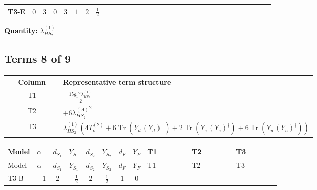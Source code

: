 \documentclass[8pt]{article}
\begin{document}
\begin{landscape}
\begin{longtable}{@{}llcccccc >{\raggedright\arraybackslash}p{0.21\linewidth} >{\raggedright\arraybackslash}p{0.21\linewidth} >{\raggedright\arraybackslash}p{0.21\linewidth}@{}}
\midrule
T3-E & $0$ & $3$ & $0$ & $3$ & $1$ & $2$ & $\frac{1}{2}$ & \scriptsize\adjustbox{max width=\linewidth}{$\begin{gathered} +6 {g_2}^4\end{gathered}$} & \scriptsize\adjustbox{max width=\linewidth}{$\begin{gathered} -\frac{33 {g_2}^2 {\lambda_{HS_2}^{(1)}}}{2}\end{gathered}$} & \scriptsize\adjustbox{max width=\linewidth}{$\begin{gathered} +3 {g_1}^4\end{gathered}$} \\
\midrule
\bottomrule
\end{longtable}
\clearpage
\noindent\textbf{Quantity: }$\lambda_{HS_2}^{(1)}$\par\smallskip
\subsection*{Terms 8 of 9}
\begin{center}
\begin{tabular}{@{}c >{\raggedright\arraybackslash}p{0.82\linewidth}@{}}
\toprule
Column & Representative term structure \\
\midrule
T1 & \(\displaystyle -\frac{15 {g_1}^2 {\lambda_{HS_2}^{(1)}}}{2}\) \\
\midrule
T2 & \(\displaystyle +6 {\lambda_{HS_2}^{(A)}}^2\) \\
\midrule
T3 & \(\displaystyle {\lambda_{HS_2}^{(1)}} (4 T_{\nu}^{(2)}+6 \operatorname{Tr}\!\left({Y_d}\,\left({Y_d}\right)^{\dagger}\right)+2 \operatorname{Tr}\!\left({Y_e}\,\left({Y_e}\right)^{\dagger}\right)+6 \operatorname{Tr}\!\left({Y_u}\,\left({Y_u}\right)^{\dagger}\right))\) \\
\midrule
\bottomrule
\end{tabular}
\end{center}
\smallskip
\tiny
\begin{longtable}{@{}llcccccc >{\raggedright\arraybackslash}p{0.21\linewidth} >{\raggedright\arraybackslash}p{0.21\linewidth} >{\raggedright\arraybackslash}p{0.21\linewidth}@{}}
\toprule
Model & $\alpha$ & $d_{S_1}$ & $Y_{S_1}$ & $d_{S_2}$ & $Y_{S_2}$ & $d_F$ & $Y_F$ & T1 & T2 & T3 \\
\midrule
\endfirsthead
\toprule
Model & $\alpha$ & $d_{S_1}$ & $Y_{S_1}$ & $d_{S_2}$ & $Y_{S_2}$ & $d_F$ & $Y_F$ & T1 & T2 & T3 \\
\midrule
\endhead
T3-B & $-1$ & $2$ & $-\frac{1}{2}$ & $2$ & $\frac{1}{2}$ & $1$ & $0$ & --- & --- & --- \\

\end{longtable}
\end{landscape}
\end{document}
